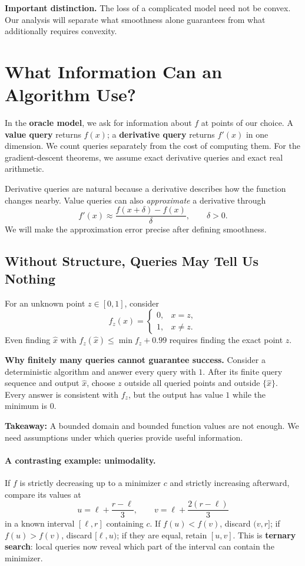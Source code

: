 \documentclass[11pt,letterpaper]{article}
\newif\ifstudentversion
\newcommand{\hide}[1]{%
  \ifstudentversion
    \ifmmode\phantom{#1}\else\underline{\phantom{#1}}\fi
  \else #1\fi}
\theoremstyle{definition}
\theoremstyle{plain}
\begin{document}
\textbf{Important distinction.} The loss of a complicated model need not be
convex. Our analysis will separate what smoothness alone guarantees from
what additionally requires convexity.

\newpage
\section{What Information Can an Algorithm Use?}

In the \hide{\textbf{oracle model}}, we ask for information about $f$ at
points of our choice. A \textbf{value query} returns $f(x)$; a
\textbf{derivative query} returns $f'(x)$ in one dimension.
We count queries separately from the cost of computing them.
For the gradient-descent theorems, we assume exact derivative queries and
exact real arithmetic.

Derivative queries are natural because a derivative describes how the
function changes nearby. Value queries can also \emph{approximate} a
derivative through
\[
  f'(x)\approx\frac{f(x+\delta)-f(x)}{\delta},
  \qquad \delta>0.
\]
We will make the approximation error precise after defining smoothness.

\subsection{Without Structure, Queries May Tell Us Nothing}

For an unknown point $z\in[0,1]$, consider
\[
  f_z(x)=
  \begin{cases}
    0,&x=z,\\
    1,&x\neq z.
  \end{cases}
\]
Even finding $\widehat x$ with $f_z(\widehat x)\leq\min f_z+0.99$ requires
finding \hide{the exact point $z$}.

\textbf{Why finitely many queries cannot guarantee success.}
Consider a deterministic algorithm and answer every query with $1$.
After its finite query sequence and output $\widehat x$, choose $z$ outside
all queried points and outside $\{\widehat x\}$. Every answer is consistent
with $f_z$, but the output has value $1$ while the minimum is $0$.

\textbf{Takeaway:} A bounded domain and bounded function values are not
enough. We need assumptions under which queries provide useful information.

\paragraph{A contrasting example: unimodality.}
If $f$ is strictly decreasing up to a minimizer $c$ and strictly increasing
afterward, compare its values at
\[
  u=\ell+\frac{r-\ell}{3},\qquad
  v=\ell+\frac{2(r-\ell)}{3}
\]
in a known interval $[\ell,r]$ containing $c$. If $f(u)<f(v)$, discard
$(v,r]$; if $f(u)>f(v)$, discard $[\ell,u)$; if they are equal, retain $[u,v]$.
This is \hide{\textbf{ternary search}}: local queries now reveal which
part of the interval can contain the minimizer.
\end{document}
